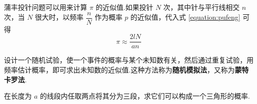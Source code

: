 \begin{solution}
\begin{figure}[H]
\begin{minipage}[b]{0.48\linewidth}
            \caption{}
            \label{fig:pufeng:1}
        \end{minipage}
        \hfill
        \begin{minipage}[b]{0.48\linewidth}
            \centering
    
            
            \caption{}
            \label{fig:pufeng:2}
        \end{minipage}
    \end{figure}
\end{solution}

蒲丰投针问题可以用来计算 $\pi$ 的近似值.如果投针 $N$ 次，其中针与平行线相交 $n$ 次，当 $N$ 很大时，以频率 $\dfrac{n}{N}$ 作为概率 $p$ 的近似值，代入式 \eqref{equation:pufeng} 可得
$$
\pi \approx \dfrac{2lN}{an}
$$

设计一个随机试验，使一个事件的概率与某个未知数有关，然后通过重复试验，用频率估计概率，即可求出未知数的近似值.这种方法称为\textbf{随机模拟法}，又称为\textbf{蒙特卡罗法}.

\vspace{0.5em}

\begin{example}
    \indent 在长度为 $a$ 的线段内任取两点将其分为三段，求它们可以构成一个三角形的概率.
\end{example}


